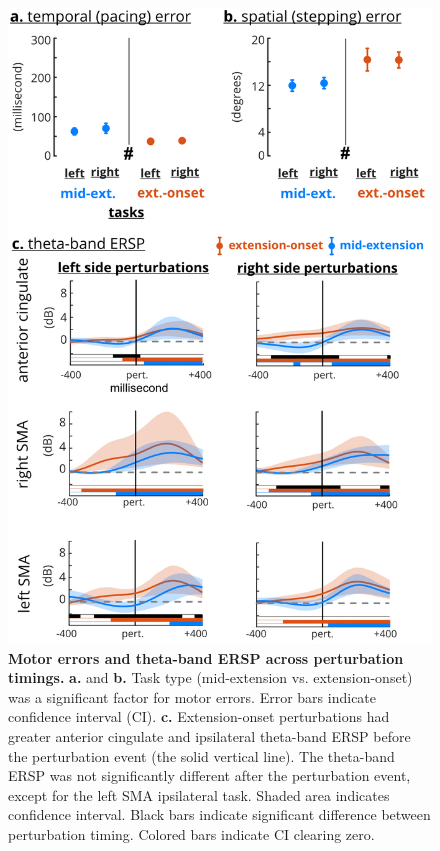 \documentclass[../thesis_seyed.tex]{subfiles}
\begin{document}
\begin{figure}[!h]
\centerline{\includegraphics{../img/hyp3 - perturb timing-fdr.jpg}}
\caption{\textbf{Motor errors and theta-band ERSP across perturbation timings.} \textbf{a.} and \textbf{b.} Task type (mid-extension vs. extension-onset) was a significant factor for motor errors. Error bars indicate confidence interval (CI). \textbf{c.} Extension-onset perturbations had greater anterior cingulate and ipsilateral theta-band ERSP before the perturbation event (the solid vertical line). The theta-band ERSP was not significantly different after the perturbation event, except for the left SMA ipsilateral task. Shaded area indicates confidence interval. Black bars indicate significant difference between perturbation timing. Colored bars indicate CI clearing zero.}
\label{fig:fig7}
\end{figure}
\end{document}
